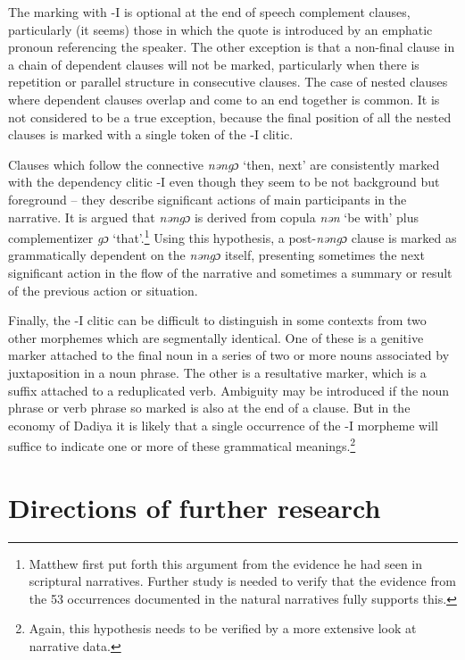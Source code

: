 \documentclass[output=paper]{langscibook}
\begin{document}
The marking with -I is optional at the end of speech complement clauses, particularly (it seems) those in which the quote is introduced by an emphatic pronoun referencing the speaker. The other exception is that a non-final clause in a chain of dependent clauses will not be marked, particularly when there is repetition or parallel structure in consecutive clauses. The case of nested clauses where dependent clauses overlap and come to an end together is common. It is not considered to be a true exception, because the final position of all the nested clauses is marked with a single token of the -I clitic.

\begin{sloppypar}
Clauses which follow the connective \textit{nəngɔ} `then, next' are consistently marked with the dependency clitic -I even though they seem to be not background but foreground – they describe significant actions of main participants in the narrative. It is argued that \textit{nəngɔ} is derived from copula \textit{nən} `be with' plus complementizer \textit{gɔ} `that'.\footnote{Matthew \citet[4]{Harley2017} first put forth this argument from the evidence he had seen in scriptural narratives. Further study is needed to verify that the evidence from the 53 occurrences documented in the natural narratives fully supports this.} Using this hypothesis, a post-\textit{nəngɔ} clause is marked as grammatically dependent on the \textit{nəngɔ} itself, presenting sometimes the next significant action in the flow of the narrative and sometimes a summary or result of the previous action or situation.
\end{sloppypar}

Finally, the -I clitic can be difficult to distinguish in some contexts from two other morphemes which are segmentally identical. One of these is a genitive marker attached to the final noun in a series of two or more nouns associated by juxtaposition in a noun phrase. The other is a resultative marker, which is a suffix attached to a reduplicated verb. Ambiguity may be introduced if the noun phrase or verb phrase so marked is also at the end of a clause. But in the economy of Dadiya it is likely that a single occurrence of the -I morpheme will suffice to indicate one or more of these grammatical meanings.\footnote{Again, this hypothesis needs to be verified by a more extensive look at narrative data.}

\section{Directions of further research}
\end{document}
